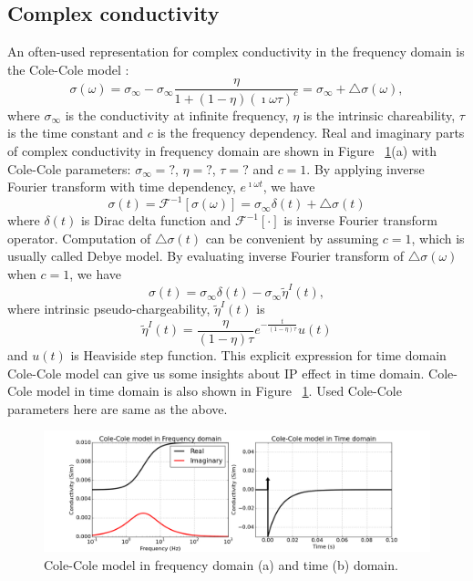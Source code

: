 \documentclass[a4paper, 11pt]{article}
\newcommand{\siginf}{\sigma_\infty}
\newcommand{\peta}{\tilde{\eta}}
\begin{document}
\subsection{Complex conductivity}
An often-used representation for complex conductivity in the frequency domain is the Cole-Cole model \cite{COLE}:
\begin{equation}
  \sigma(\omega) = \sigma_{\infty} - \sigma_{\infty}\frac{\eta}{1+(1-\eta)(\imath\omega\tau)^c} = \sigma_{\infty} + \triangle\sigma(\omega),
  \label{eq: sigma_freq}
\end{equation}
where $\sigma_{\infty}$ is the conductivity at infinite frequency, $\eta$ is the intrinsic chareability, $\tau$ is the time constant and $c$ is the frequency dependency. Real and imaginary parts of complex conductivity in frequency domain are shown in Figure ~\ref{Fig:FDandTDCole}(a) with Cole-Cole parameters: $\siginf = ?$, $\eta = ?$, $\tau = ?$ and $c=1$. By applying inverse Fourier transform with time dependency, $e^{\imath\omega t}$, we have
\begin{equation}
  \sigma(t) = \mathscr{F}^{-1}[\sigma(\omega)] = \sigma_{\infty}\delta(t) + \triangle\sigma(t)
  \label{eq: sigma_time}
\end{equation}
where $\delta(t)$ is Dirac delta function and $\mathscr{F}^{-1}[\cdot]$ is inverse Fourier transform operator. Computation of $\triangle\sigma(t)$ can be convenient by assuming $c=1$, which is usually called Debye model. By evaluating inverse Fourier transform of $\triangle\sigma(\omega)$ when $c=1$, we have
\begin{equation}
  \sigma(t) = \sigma_{\infty}\delta(t) - \siginf\peta^{I}(t),
  \label{eq: sigma_time_c1}
\end{equation}
where intrinsic pseudo-chargeability, $\peta^{I}(t)$ is
\begin{equation}
    \peta^{I}(t) = \frac{\eta}{(1-\eta)\tau}e^{-\frac{t}{(1-\eta)\tau}}u(t)
    \label{eq: intrinsic_peta}
\end{equation}
and $u(t)$ is Heaviside step function. This explicit expression for time domain Cole-Cole model can give us some insights about IP effect in time domain. Cole-Cole model in time domain is also shown in Figure ~\ref{Fig:FDandTDCole}. Used Cole-Cole parameters here are same as the above.
\begin{figure}[htb]
  \centering
  \includegraphics[width=1.0\textwidth]{figures/FDandTDCole.png}
  \caption{Cole-Cole model in frequency domain (a) and time (b) domain. }
  \label{Fig:FDandTDCole}
\end{figure}
\clearpage
\end{document}
